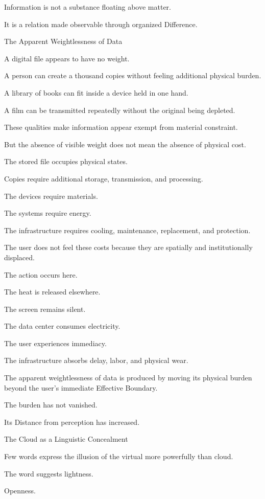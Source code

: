Information is not a substance floating above matter.

It is a relation made observable through organized Difference.

The Apparent Weightlessness of Data

A digital file appears to have no weight.

A person can create a thousand copies without feeling additional physical burden.

A library of books can fit inside a device held in one hand.

A film can be transmitted repeatedly without the original being depleted.

These qualities make information appear exempt from material constraint.

But the absence of visible weight does not mean the absence of physical cost.

The stored file occupies physical states.

Copies require additional storage, transmission, and processing.

The devices require materials.

The systems require energy.

The infrastructure requires cooling, maintenance, replacement, and protection.

The user does not feel these costs because they are spatially and institutionally displaced.

The action occurs here.

The heat is released elsewhere.

The screen remains silent.

The data center consumes electricity.

The user experiences immediacy.

The infrastructure absorbs delay, labor, and physical wear.

The apparent weightlessness of data is produced by moving its physical burden beyond the user’s immediate Effective Boundary.

The burden has not vanished.

Its Distance from perception has increased.

The Cloud as a Linguistic Concealment

Few words express the illusion of the virtual more powerfully than cloud.

The word suggests lightness.

Openness.

